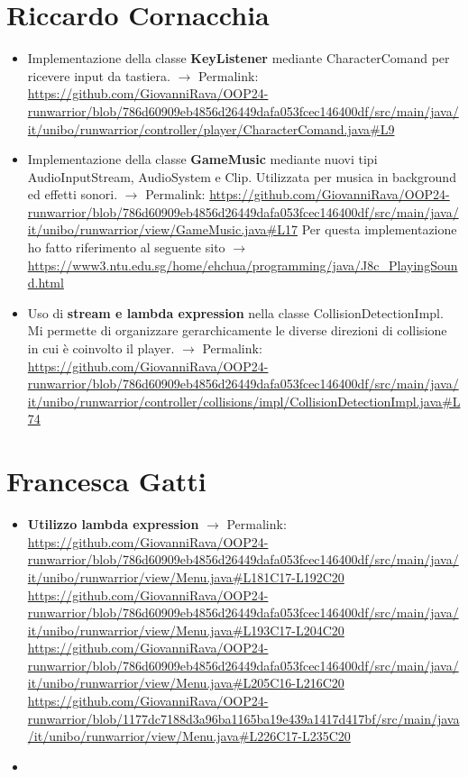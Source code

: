 \documentclass[a4paper,12pt]{report}
\begin{document}
\section{Riccardo Cornacchia}
\begin{itemize}
    \item Implementazione della classe \textbf{KeyListener} mediante CharacterComand per ricevere input da tastiera. $\rightarrow$ Permalink:
    \url{https://github.com/GiovanniRava/OOP24-runwarrior/blob/786d60909eb4856d26449dafa053fcec146400df/src/main/java/it/unibo/runwarrior/controller/player/CharacterComand.java#L9}
    \item Implementazione della classe \textbf{GameMusic} mediante nuovi tipi AudioInputStream, AudioSystem e Clip. 
    Utilizzata per musica in background ed effetti sonori. $\rightarrow$ Permalink:
    \url{https://github.com/GiovanniRava/OOP24-runwarrior/blob/786d60909eb4856d26449dafa053fcec146400df/src/main/java/it/unibo/runwarrior/view/GameMusic.java#L17}
    Per questa implementazione ho fatto riferimento al seguente sito $\rightarrow$
    \url{https://www3.ntu.edu.sg/home/ehchua/programming/java/J8c_PlayingSound.html}
    \item Uso di \textbf{stream e lambda expression} nella classe CollisionDetectionImpl. Mi permette di organizzare gerarchicamente 
    le diverse direzioni di collisione in cui è coinvolto il player. $\rightarrow$ Permalink:
    \url{https://github.com/GiovanniRava/OOP24-runwarrior/blob/786d60909eb4856d26449dafa053fcec146400df/src/main/java/it/unibo/runwarrior/controller/collisions/impl/CollisionDetectionImpl.java#L74}
\end{itemize}

\section{Francesca Gatti}
\begin{itemize}
    \item \textbf{Utilizzo lambda expression} $\rightarrow$ Permalink:
    \url{https://github.com/GiovanniRava/OOP24-runwarrior/blob/786d60909eb4856d26449dafa053fcec146400df/src/main/java/it/unibo/runwarrior/view/Menu.java#L181C17-L192C20}
    \url{https://github.com/GiovanniRava/OOP24-runwarrior/blob/786d60909eb4856d26449dafa053fcec146400df/src/main/java/it/unibo/runwarrior/view/Menu.java#L193C17-L204C20}
    \url{https://github.com/GiovanniRava/OOP24-runwarrior/blob/786d60909eb4856d26449dafa053fcec146400df/src/main/java/it/unibo/runwarrior/view/Menu.java#L205C16-L216C20}
    \url{https://github.com/GiovanniRava/OOP24-runwarrior/blob/1177dc7188d3a96ba1165ba19e439a1417d417bf/src/main/java/it/unibo/runwarrior/view/Menu.java#L226C17-L235C20}
    \item
\end{itemize}
\end{document}
